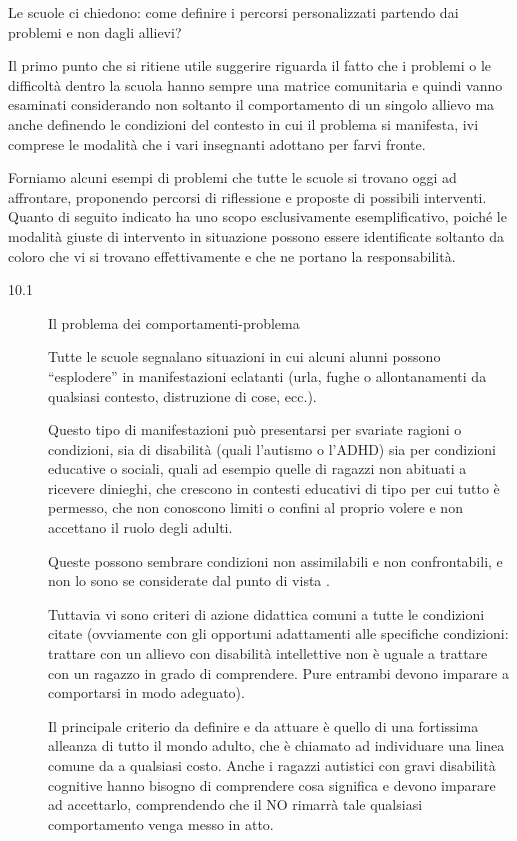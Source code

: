\begin{description}
\begin{enumerate}
 	Le scuole ci chiedono: come definire i percorsi personalizzati partendo dai problemi e non dagli allievi?
 	
 	Il primo punto che si ritiene utile suggerire riguarda il fatto che i problemi o le difficoltà dentro la scuola
 	hanno sempre una matrice comunitaria e quindi vanno esaminati considerando non soltanto il
 	comportamento di un singolo allievo ma anche definendo le condizioni del contesto in cui il problema
 	si manifesta, ivi comprese le modalità che i vari insegnanti adottano per farvi fronte.
 	
 	Forniamo alcuni esempi di problemi che tutte le scuole si trovano oggi ad affrontare, proponendo
 	percorsi di riflessione e proposte di possibili interventi. Quanto di seguito indicato ha uno scopo
 	esclusivamente esemplificativo, poiché le modalità giuste di intervento in situazione possono essere
 	identificate soltanto da coloro che vi si trovano effettivamente e che ne portano la responsabilità.
 	\begin{description}
 		\item[10.1]Il problema dei comportamenti-problema
 		
 		Tutte le scuole segnalano situazioni in cui alcuni alunni possono “esplodere” in manifestazioni eclatanti
 		(urla, fughe o allontanamenti da qualsiasi contesto, distruzione di cose, ecc.).
 		
 		Questo tipo di manifestazioni può presentarsi per svariate ragioni o condizioni, sia di disabilità (quali
 		l'autismo o l'ADHD) sia per condizioni educative o sociali, quali ad esempio quelle di ragazzi non
 		abituati a ricevere dinieghi, che crescono in contesti educativi di tipo  per cui tutto
 		è permesso, che non conoscono limiti o confini al proprio volere e non accettano il ruolo degli adulti.
 		
 		Queste possono sembrare condizioni non assimilabili e non confrontabili, e non lo sono se considerate
 		dal punto di vista .
 		
 		Tuttavia vi sono criteri di azione didattica comuni a tutte le condizioni citate (ovviamente con gli
 		opportuni adattamenti alle specifiche condizioni: trattare con un allievo con disabilità intellettive non è uguale a trattare con un ragazzo in grado di comprendere. Pure entrambi devono imparare a
 		comportarsi in modo adeguato).
 		
 		Il principale criterio da definire e da attuare è quello di una fortissima alleanza di tutto il mondo adulto,
 		che è chiamato ad individuare una linea comune da  a qualsiasi costo. Anche i ragazzi autistici
 		con gravi disabilità cognitive hanno bisogno di comprendere cosa significa  e devono imparare ad
 		accettarlo, comprendendo che il NO rimarrà tale qualsiasi comportamento venga messo in atto.
 		

\end{description}
\end{enumerate}
\end{description}
